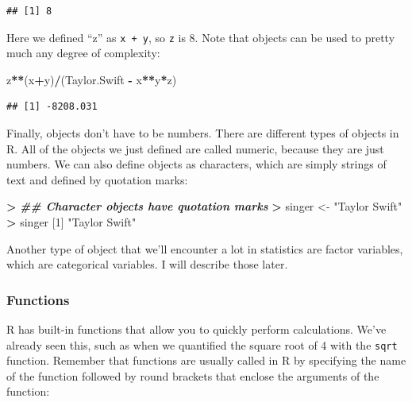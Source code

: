\documentclass[
]{book}
\newenvironment{Shaded}{\begin{snugshade}}{\end{snugshade}}
\newcommand{\DecValTok}[1]{\textcolor[rgb]{0.00,0.00,0.81}{#1}}
\newcommand{\DocumentationTok}[1]{\textcolor[rgb]{0.56,0.35,0.01}{\textbf{\textit{#1}}}}
\newcommand{\ErrorTok}[1]{\textcolor[rgb]{0.64,0.00,0.00}{\textbf{#1}}}
\newcommand{\NormalTok}[1]{#1}
\newcommand{\OtherTok}[1]{\textcolor[rgb]{0.56,0.35,0.01}{#1}}
\newcommand{\SpecialCharTok}[1]{\textcolor[rgb]{0.81,0.36,0.00}{\textbf{#1}}}
\newcommand{\StringTok}[1]{\textcolor[rgb]{0.31,0.60,0.02}{#1}}
\begin{document}
\begin{verbatim}
## [1] 8
\end{verbatim}

Here we defined ``z'' as \texttt{x\ +\ y}, so \texttt{z} is 8. Note that objects can be used to pretty much any degree of complexity:

\begin{Shaded}
\begin{Highlighting}[]
\NormalTok{z}\SpecialCharTok{**}\NormalTok{(x}\SpecialCharTok{+}\NormalTok{y)}\SpecialCharTok{/}\NormalTok{(Taylor.Swift }\SpecialCharTok{{-}}\NormalTok{ x}\SpecialCharTok{**}\NormalTok{y}\SpecialCharTok{*}\NormalTok{z)}
\end{Highlighting}
\end{Shaded}

\begin{verbatim}
## [1] -8208.031
\end{verbatim}

Finally, objects don't have to be numbers. There are different types of objects in R. All of the objects we just defined are called numeric, because they are just numbers. We can also define objects as characters, which are simply strings of text and defined by quotation marks:

\begin{Shaded}
\begin{Highlighting}[]
\SpecialCharTok{\textgreater{}} \DocumentationTok{\#\# Character objects have quotation marks}
\ErrorTok{\textgreater{}}\NormalTok{ singer }\OtherTok{\textless{}{-}} \StringTok{"Taylor Swift"}
\SpecialCharTok{\textgreater{}}\NormalTok{ singer}
\NormalTok{[}\DecValTok{1}\NormalTok{] }\StringTok{"Taylor Swift"}
\end{Highlighting}
\end{Shaded}

Another type of object that we'll encounter a lot in statistics are factor variables, which are categorical variables. I will describe those later.

\subsubsection{Functions}\label{functions}

R has built-in functions that allow you to quickly perform calculations. We've already seen this, such as when we quantified the square root of 4 with the \texttt{sqrt} function. Remember that functions are usually called in R by specifying the name of the function followed by round brackets that enclose the arguments of the function:
\end{document}
